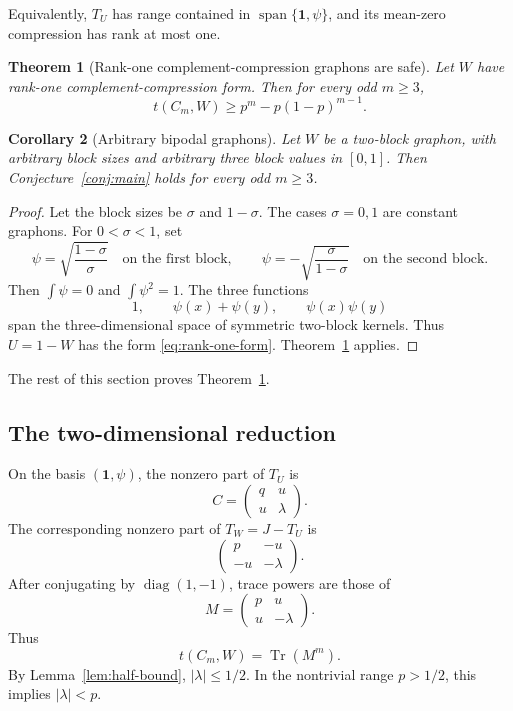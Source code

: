 \documentclass[11pt]{article}
\newtheorem{theorem}{Theorem}[section]
\newtheorem{corollary}[theorem]{Corollary}
\newcommand{\one}{\mathbf 1}
\newcommand{\Tr}{\operatorname{Tr}}
\begin{document}
Equivalently, $T_U$ has range contained in $\operatorname{span}\{\one,\psi\}$, and its mean-zero compression has rank at most one.

\begin{theorem}[Rank-one complement-compression graphons are safe]\label{thm:rank-one-safe}
Let $W$ have rank-one complement-compression form.  Then for every odd $m\ge3$,
\begin{equation}\label{eq:rank-one-conclusion}
        t(C_m,W)\ge p^m-p(1-p)^{m-1}.
\end{equation}
\end{theorem}

\begin{corollary}[Arbitrary bipodal graphons]\label{cor:arbitrary-bipodal}
Let $W$ be a two-block graphon, with arbitrary block sizes and arbitrary three block values in $[0,1]$.  Then Conjecture~\ref{conj:main} holds for every odd $m\ge3$.
\end{corollary}

\begin{proof}
Let the block sizes be $\sigma$ and $1-\sigma$.  The cases $\sigma=0,1$ are constant graphons.  For $0<\sigma<1$, set
\[
        \psi=\sqrt{\frac{1-\sigma}{\sigma}}
        \quad\text{on the first block},
        \qquad
        \psi=-\sqrt{\frac{\sigma}{1-\sigma}}
        \quad\text{on the second block}.
\]
Then $\int\psi=0$ and $\int\psi^2=1$.  The three functions
\[
        1,
        \qquad \psi(x)+\psi(y),
        \qquad \psi(x)\psi(y)
\]
span the three-dimensional space of symmetric two-block kernels.  Thus $U=1-W$ has the form \eqref{eq:rank-one-form}.  Theorem~\ref{thm:rank-one-safe} applies.
\end{proof}

The rest of this section proves Theorem~\ref{thm:rank-one-safe}.

\subsection{The two-dimensional reduction}

On the basis $(\one,\psi)$, the nonzero part of $T_U$ is
\[
        C=\begin{pmatrix}q&u\\ u&\lambda\end{pmatrix}.
\]
The corresponding nonzero part of $T_W=J-T_U$ is
\[
        \begin{pmatrix}p&-u\\ -u&-\lambda\end{pmatrix}.
\]
After conjugating by $\operatorname{diag}(1,-1)$, trace powers are those of
\begin{equation}\label{eq:M-rank-one}
        M=\begin{pmatrix}p&u\\ u&-\lambda\end{pmatrix}.
\end{equation}
Thus
\begin{equation}\label{eq:tCm-rank-one-trace}
        t(C_m,W)=\Tr(M^m).
\end{equation}
By Lemma~\ref{lem:half-bound}, $|\lambda|\le1/2$.  In the nontrivial range $p>1/2$, this implies $|\lambda|<p$.
\end{document}
